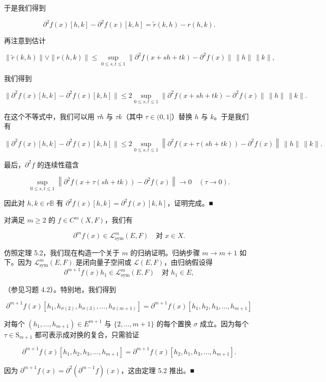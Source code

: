 \begin{theorem}
\begin{subitems}
于是我们得到

\[
\partial^{2}f(x)[h, k] - \partial^{2}f(x)[k, h] = \tilde{r}(k, h) - r(h, k) .
\]

再注意到估计

\[
\|\tilde{r}(k, h)\| \vee \|r(h, k)\| \le \sup_{0 \le s,t \le 1}\|\partial^{2}f(x + sh + tk) - \partial^{2}f(x)\|\,\|h\|\,\|k\| ,
\]

我们得到

\[
\|\partial^{2}f(x)[h, k] - \partial^{2}f(x)[k, h]\| \le 2\sup_{0 \le s,t \le 1}\|\partial^{2}f(x + sh + tk) - \partial^{2}f(x)\|\,\|h\|\,\|k\| .
\]

在这个不等式中，我们可以用 $ \tau h $ 与 $ \tau k $（其中 $ \tau \in (0, 1] $）替换 $ h $ 与 $ k $。于是我们有

\[
\|\partial^{2}f(x)[h, k] - \partial^{2}f(x)[k, h]\| \le 2\sup_{0 \le s,t \le 1}\left\|\partial^{2}f\left( x + \tau(sh + tk) \right) - \partial^{2}f(x)\right\|\,\|h\|\,\|k\| .
\]

最后，$ \partial^{2}f $ 的连续性蕴含

\[
\sup_{0 \le s,t \le 1}\left\|\partial^{2}f\left( x + \tau(sh + tk) \right) - \partial^{2}f(x)\right\| \to 0 \quad (\tau \to 0) .
\]

因此对 $ h, k \in r\mathbb{B} $ 有 $ \partial^{2}f(x)[h, k] = \partial^{2}f(x)[k, h] $，证明完成。\nobreak\hspace{0.35em}■

\end{subitems}

\end{theorem}

\begin{corollary}

对满足 $ m \ge 2 $ 的 $ f \in C^{m}(X, F) $，我们有

\[
\partial^{m}f(x) \in \mathcal{L}^{m}_{\mathrm{sym}}(E, F) \quad \text{对 } x \in X .
\]

\proofhead
仿照定理 5.2，我们现在构造一个关于 $ m $ 的归纳证明。归纳步骤 $ m \to m + 1 $ 如下。因为 $ \mathcal{L}^{m}_{\mathrm{sym}}(E, F) $ 是闭向量子空间或 $ \mathcal{L}(E, F) $，由归纳假设得
\[
\partial^{m+1}f(x)h_{1} \in \mathcal{L}^{m}_{\mathrm{sym}}(E, F) \quad \text{对 } h_{1} \in E ,
\]

（参见习题 4.2）。特别地，我们得到

\[
\partial^{m+1}f(x)[h_{1}, h_{\sigma(2)}, h_{\sigma(3)}, \ldots, h_{\sigma(m+1)}] = \partial^{m+1}f(x)[h_{1}, h_{2}, h_{3}, \ldots, h_{m+1}]
\]

对每个 $ (h_{1}, \ldots, h_{m+1}) \in E^{m+1} $ 与 $ \{2, \ldots, m+1\} $ 的每个置换 $ \sigma $ 成立。因为每个 $ \tau \in \mathrm{S}_{m+1} $ 都可表示成对换的复合，只需验证

\[
\partial^{m+1}f(x)[h_{1}, h_{2}, h_{3}, \ldots, h_{m+1}] = \partial^{m+1}f(x)[h_{2}, h_{1}, h_{3}, \ldots, h_{m+1}] .
\]

因为 $ \partial^{m+1}f(x) = \partial^{2}(\partial^{m-1}f)(x) $，这由定理 5.2 推出。\nobreak\hspace{0.35em}■

\end{corollary}

